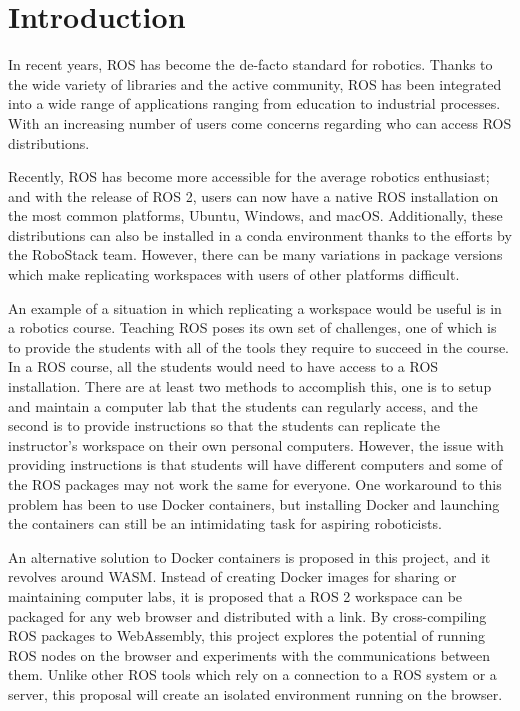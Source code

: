 \chapter{Introduction}\label{cha:introduction}

In recent years, \ac{ROS} has become the de-facto standard for robotics. Thanks to the wide variety of libraries and the active community, \ac{ROS} has been integrated into a wide range of applications ranging from education to industrial processes. With an increasing number of users come concerns regarding who can access \ac{ROS} distributions.

Recently, \ac{ROS} has become more accessible for the average robotics enthusiast; and with the release of \ac{ROS} 2, users can now have a native \ac{ROS} installation on the most common platforms, Ubuntu, Windows, and macOS. Additionally, these distributions can also be installed in a \textsf{conda} environment thanks to the efforts by the RoboStack team. However, there can be many variations in package versions which make replicating workspaces with users of other platforms difficult. 

An example of a situation in which replicating a workspace would be useful is in a robotics course. Teaching \ac{ROS} poses its own set of challenges, one of which is to provide the students with all of the tools they require to succeed in the course. In a \ac{ROS} course, all the students would need to have access to a \ac{ROS} installation. There are at least two methods to accomplish this, one is to setup and maintain a computer lab that the students can regularly access, and the second is to provide instructions so that the students can replicate the instructor's workspace on their own personal computers. However, the issue with providing instructions is that students will have different computers and some of the \ac{ROS} packages may not work the same for everyone. One workaround to this problem has been to use Docker containers, but installing Docker and launching the containers can still be an intimidating task for aspiring roboticists. 


An alternative solution to Docker containers is proposed in this project, and it revolves around \ac{WASM}. Instead of creating Docker images for sharing or maintaining computer labs, it is proposed that a \ac{ROS} 2 workspace can be packaged for any web browser and distributed with a link. By cross-compiling \ac{ROS} packages to WebAssembly, this project explores the potential of running \ac{ROS} nodes on the browser and experiments with the communications between them. Unlike other \ac{ROS} tools which rely on a connection to a \ac{ROS} system or a server, this proposal will create an isolated environment running on the browser. 

